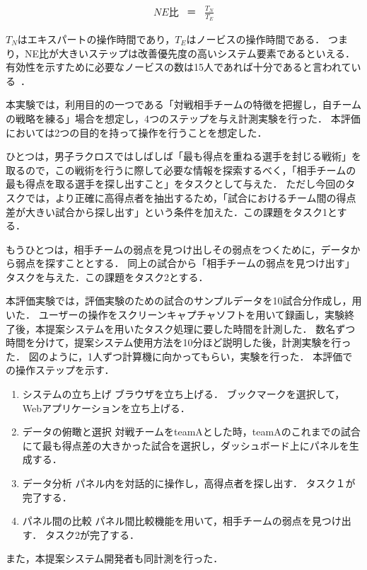 \documentclass[sotsuron]{kuee}
\begin{document}
					\begin{eqnarray}
						NE比 & ＝ & \frac{T_N}{T_E}
					\end{eqnarray}
					
					$T_N$はエキスパートの操作時間であり，$T_E$はノービスの操作時間である．
					つまり，NE比が大きいステップは改善優先度の高いシステム要素であるといえる．
					有効性を示すために必要なノービスの数は15人であれば十分であると言われている~\cite{Nielsen}．
					
					本実験では，利用目的の一つである「対戦相手チームの特徴を把握し，自チームの戦略を練る」場合を想定し，4つのステップを与え計測実験を行った．
					本評価においては2つの目的を持って操作を行うことを想定した．
					
					ひとつは，男子ラクロスではしばしば「最も得点を重ねる選手を封じる戦術」を取るので，この戦術を行うに際して必要な情報を探索するべく，「相手チームの最も得点を取る選手を探し出すこと」をタスクとして与えた．
					ただし今回のタスクでは，より正確に高得点者を抽出するため，「試合におけるチーム間の得点差が大きい試合から探し出す」という条件を加えた．この課題をタスク1とする．
					
					もうひとつは，相手チームの弱点を見つけ出しその弱点をつくために，データから弱点を探すこととする．
					同上の試合から「相手チームの弱点を見つけ出す」タスクを与えた．この課題をタスク2とする．
					
					本評価実験では，評価実験のための試合のサンプルデータを10試合分作成し，用いた．
					ユーザーの操作をスクリーンキャプチャソフトを用いて録画し，実験終了後，本提案システムを用いたタスク処理に要した時間を計測した．
					数名ずつ時間を分けて，提案システム使用方法を10分ほど説明した後，計測実験を行った．
					図のように，1人ずつ計算機に向かってもらい，実験を行った．
					本評価での操作ステップを示す．
					\begin{enumerate}
						\item システムの立ち上げ
							ブラウザを立ち上げる．
							ブックマークを選択して，Webアプリケーションを立ち上げる．
						\item データの俯瞰と選択
							対戦チームをteamAとした時，teamAのこれまでの試合にて最も得点差の大きかった試合を選択し，ダッシュボード上にパネルを生成する．
						\item データ分析
							パネル内を対話的に操作し，高得点者を探し出す．
							タスク１が完了する．
						\item パネル間の比較
							パネル間比較機能を用いて，相手チームの弱点を見つけ出す．
							タスク2が完了する．
					\end{enumerate}
					また，本提案システム開発者も同計測を行った．
\end{document}
